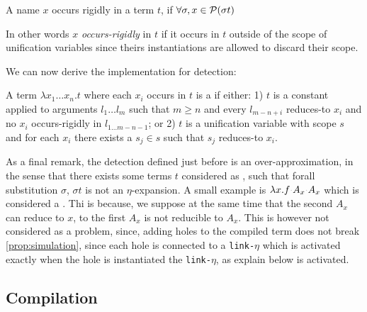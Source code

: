 \documentclass[sigconf,natbib=false,review]{acmart}
\newcommand{\appsep}{\ensuremath{\textcolor{lightgray}{\cdot}}}
\newcommand{\linketa}{\texttt{link-}\ensuremath{\eta}\xspace}
\begin{document}
\begin{definition}
  A name $x$ occurs rigidly in a term $t$, if $\forall \sigma, x \in
  \mathcal{P}(\sigma t)$
\end{definition}
In other words $x$ \emph{occurs-rigidly} in $t$ if it occurs in $t$
outside of the scope of unification variables since theirs instantiations
are allowed to discard their scope.

We can now derive the implementation for \maybeeta detection:

\begin{definition}
  A term $\lambda x_1 \ldots x_n.t$ where each $x_i$ occurs in $t$ is a
  \maybeeta if
  either: 1) $t$ is a constant applied to arguments
  $l_1 \ldots l_m$ such that 
  $m \geq n$ and every $l_{m-n+i}$ reduces-to $x_i$ and
  no $x_i$ occurs-rigidly in $l_{1\ldots m-n-1}$; or 2) $t$ is a
  unification variable with scope $s$ and
  for each $x_i$ there exists a $s_j \in s$ such that $s_j$ reduces-to $x_i$.
\end{definition}

As a final remark, the \maybeeta detection defined just before is an
over-approximation, in the sense that there exists some terms $t$ considered as
\maybeeta, such that forall substitution $\sigma$, $\sigma t$ is not an
$\eta$-expansion. A small example is $\lambda x. f \appsep A_x \appsep A_x$
which is considered a \maybeeta. Thi is because, we suppose at the same time
that the second $A_x$ can reduce to $x$, to the first $A_x$ is not reducible to
$A_x$. This is however not considered as a problem, since, adding holes to 
the compiled term does not break \cref{prop:simulation}, since each hole is
connected to a \linketa which is activated exactly when the hole is instantiated
the \linketa, as explain below is activated.


% 


\subsection{Compilation}
\end{document}
